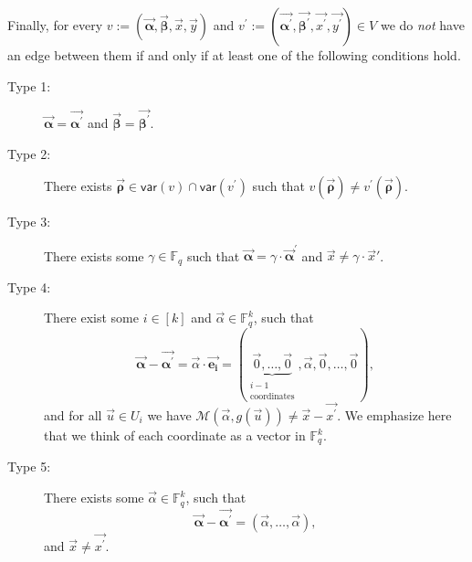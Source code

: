 \documentclass[11pt]{article}
\newcommand{\F}{\mathbb{F}}
\newcommand{\alphab}{\vec{\bm{\alpha}}}
\newcommand{\betab}{\vec{\bm{\beta}}}
\newcommand{\var}{\mathsf{var}}
\newcommand{\M}{\mathcal{M}}
\begin{document}
 
Finally, for every $v:=(\alphab,\betab,\vec{x},\vec{y})$ and $v^{\prime}:=(\vec{\bm{\alpha^{\prime}}},\vec{\bm{\beta^{\prime}}},\vec{x^{\prime}},\vec{y^{\prime}})\in V$ we do \emph{not} have an edge between them if and only if at least one of the following conditions hold.
\begin{description}
\item[Type 1:] $\vec{\bm{\alpha}}=\vec{\bm{\alpha^{\prime}}}$ and $\vec{\bm{\beta}}=\vec{\bm{\beta^{\prime}}}$. 
\item[Type 2:] There exists $\vec{\bm \rho}\in \var(v)\cap\var(v^{\prime})$ such that $v(\vec{\bm \rho})\neq v^{\prime}(\vec{\bm \rho})$.
\item[Type 3:] There exists some $\gamma\in \F_q$ such that $\alphab=\gamma\cdot \alphab^\prime$ and $\vec{x}\neq \gamma \cdot \vec{x}'$.
\item[Type 4:] There exist some $i\in[k]$ and $\vec{\alpha}\in\F_q^k$, such that $$\vec{\bm{\alpha}}-\vec{\bm{\alpha^{\prime}}}=\vec{\alpha}\cdot \vec{\bm{e_i}}=(\underbrace{\vec{0},\ldots, \vec{0}}_{\substack{i-1\\ \text{coordinates}}},\vec{\alpha},\vec{0},\ldots, \vec{0}),$$
and for all $\vec{u}\in U_i$ we have $ \M(\vec{\alpha},g(\vec{u}))\neq\vec{x}-\vec{x^{\prime}}$. We emphasize here that we think of each coordinate as a vector in $\F_q^k$. 
\item[Type 5:] There exists some $\vec{\alpha}\in\F_q^k$, such that $$\vec{\bm{\alpha}}-\vec{\bm{\alpha^{\prime}}}=(\vec{\alpha},\ldots, \vec{\alpha}),$$
and  $\vec{x}\neq\vec{x^{\prime}}$.
\end{description}
\end{document}
